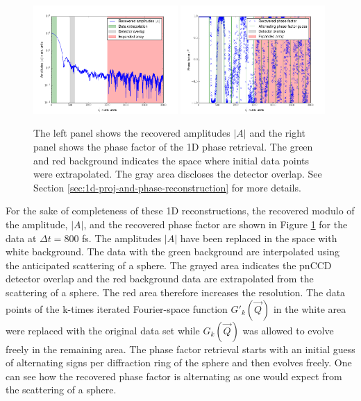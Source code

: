 \begin{figure}
	\centering
		\includegraphics[width=0.49\textwidth]{images/results/amplitude-discussion.png}
		\includegraphics[width=0.49\textwidth]{images/results/phase-discussion.png}
	\caption[Recovered Amplitudes $\lvert A\rvert$ and phase factor of 1D reconstruction]{The left panel shows the recovered amplitudes $\lvert A\rvert$ and the right panel shows the phase factor of the 1D phase retrieval. The green and red background indicates the space where initial data points were extrapolated. The gray area discloses the detector overlap. See Section \ref{sec:1d-proj-and-phase-reconstruction} for more details.}
	\label{fig:amplitude-phase}
\end{figure}
For the sake of completeness of these 1D reconstructions, the recovered modulo of the amplitude, $\lvert A\rvert$, and the recovered phase factor are shown in Figure \ref{fig:amplitude-phase} for the data at $\Delta t =800$ fs. The amplitudes $\lvert A\rvert$ have been replaced in the space with white background. The data with the green background are interpolated using the anticipated scattering of a sphere. The grayed area indicates the pnCCD detector overlap and the red background data are extrapolated from the scattering of a sphere. The red area therefore increases the resolution. The data points of the k-times iterated Fourier-space function $G'_{k}(\vec{Q})$ in the white area were replaced with the original data set while $G_{k}(\vec{Q})$ was allowed to evolve freely in the remaining area. The phase factor retrieval starts with an initial guess of alternating signs per diffraction ring of the sphere and then evolves freely. One can see how the recovered phase factor is alternating as one would expect from the scattering of a sphere.\\[1\baselineskip]
